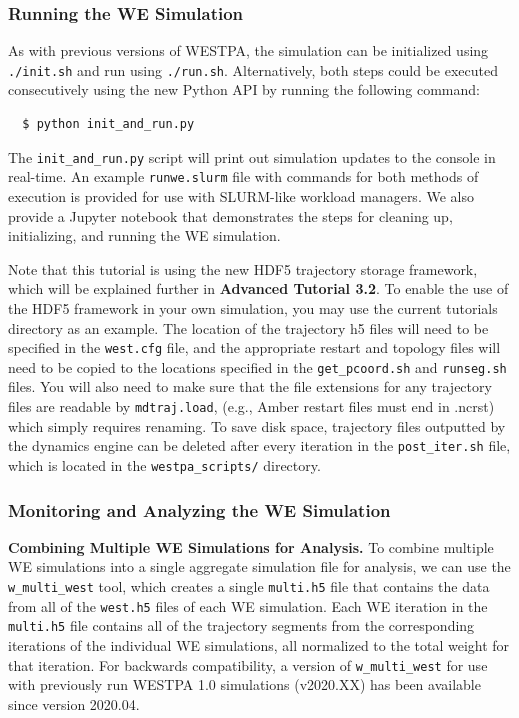\subsubsection{Running the WE Simulation}
As with previous versions of WESTPA, the simulation can be initialized using \verb|./init.sh| and run using \verb|./run.sh|. 
Alternatively, both steps could be executed consecutively using the new Python API by running the following command:

\begin{verbatim}
  $ python init_and_run.py
\end{verbatim}

The \verb|init_and_run.py| script will print out simulation updates to the console in real-time. 
An example \verb|runwe.slurm| file with commands for both methods of execution is provided for use with SLURM-like workload managers. 
We also provide a Jupyter notebook that demonstrates the steps for cleaning up, initializing, and running the WE simulation.

Note that this tutorial is using the new HDF5 trajectory storage framework, which will be explained further in \textbf{Advanced Tutorial 3.2}. 
To enable the use of the HDF5 framework in your own simulation, you may use the current tutorials directory as an example. 
The location of the trajectory h5 files will need to be specified in the \verb|west.cfg| file, and the appropriate restart and topology files will need to be copied to the locations specified in the \verb|get_pcoord.sh| and \verb|runseg.sh| files. 
You will also need to make sure that the file extensions for any trajectory files are readable by \verb|mdtraj.load|, (e.g., Amber restart files must end in .ncrst) which simply requires renaming. 
To save disk space, trajectory files outputted by the dynamics engine can be deleted after every iteration in the \verb|post_iter.sh| file, which is located in the \verb|westpa_scripts/| directory.

\subsubsection{Monitoring and Analyzing the WE Simulation}

\textbf{Combining Multiple WE Simulations for Analysis.} To combine multiple WE simulations into a single aggregate simulation file for analysis, we can use the \verb|w_multi_west| tool, which creates a single \verb|multi.h5| file that contains the data from all of the \verb|west.h5| files of each WE simulation. 
Each WE iteration in the \verb|multi.h5| file contains all of the trajectory segments from the corresponding iterations of the individual WE simulations, all normalized to the total weight for that iteration. 
For backwards compatibility, a version of \verb|w_multi_west| for use with previously run WESTPA 1.0 simulations (v2020.XX) has been available since version 2020.04.

